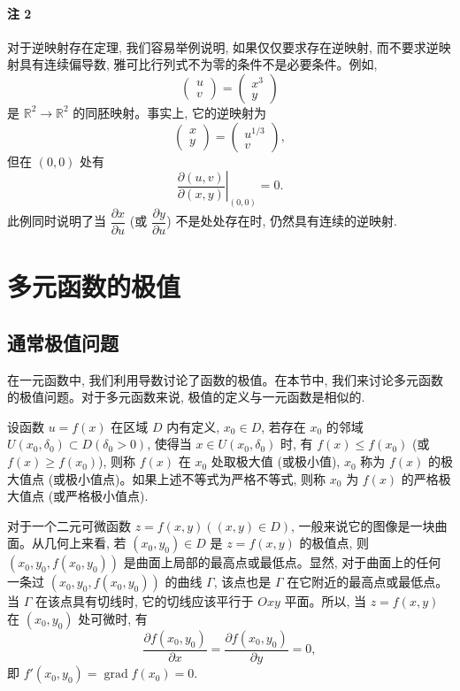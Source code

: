 \paragraph*{注 2}
对于逆映射存在定理, 我们容易举例说明, 如果仅仅要求存在逆映射, 而不要求逆映射具有连续偏导数, 雅可比行列式不为零的条件不是必要条件。例如,
\[
  \begin{pmatrix}
    u\\
    v
  \end{pmatrix}
  =
  \begin{pmatrix}
    x^3\\
    y
  \end{pmatrix}
\]
是 $\mathbb R^2\to\mathbb R^2$ 的同胚映射。事实上, 它的逆映射为
\[
  \begin{pmatrix}
    x\\
    y
  \end{pmatrix}
  =
  \begin{pmatrix}
    u^{1/3}\\
    v
  \end{pmatrix},
\]
但在 $(0,0)$ 处有
\[
  \left.
  \frac{\partial(u,v)}{\partial(x,y)}
  \right|_{(0,0)}
  =0.
\]
此例同时说明了当 $\dfrac{\partial x}{\partial u}$ (或 $\dfrac{\partial y}{\partial u}$) 不是处处存在时, 仍然具有连续的逆映射.

\section{多元函数的极值}
\label{sec:ma-14-5}

\subsection{通常极值问题}
\label{subsec:ma-14-5-1}

在一元函数中, 我们利用导数讨论了函数的极值。在本节中, 我们来讨论多元函数的极值问题。对于多元函数来说, 极值的定义与一元函数是相似的.

\begin{definition}\label{definition:ma-14-5-1}
设函数 $u=f(x)$ 在区域 $D$ 内有定义, $x_0\in D$, 若存在 $x_0$ 的邻域 $U(x_0,\delta_0)\subset D(\delta_0>0)$, 使得当 $x\in U(x_0,\delta_0)$ 时, 有 $f(x)\leqslant f(x_0)$ (或 $f(x)\geqslant f(x_0)$), 则称 $f(x)$ 在 $x_0$ 处取极大值 (或极小值), $x_0$ 称为 $f(x)$ 的极大值点 (或极小值点)。如果上述不等式为严格不等式, 则称 $x_0$ 为 $f(x)$ 的严格极大值点 (或严格极小值点).
\end{definition}

对于一个二元可微函数 $z=f(x,y)((x,y)\in D)$, 一般来说它的图像是一块曲面。从几何上来看, 若 $(x_0,y_0)\in D$ 是 $z=f(x,y)$ 的极值点, 则 $(x_0,y_0,f(x_0,y_0))$ 是曲面上局部的最高点或最低点。显然, 对于曲面上的任何一条过 $(x_0,y_0,f(x_0,y_0))$ 的曲线 $\Gamma$, 该点也是 $\Gamma$ 在它附近的最高点或最低点。当 $\Gamma$ 在该点具有切线时, 它的切线应该平行于 $Oxy$ 平面。所以, 当 $z=f(x,y)$ 在 $(x_0,y_0)$ 处可微时, 有
\[
  \frac{\partial f(x_0,y_0)}{\partial x}
  =
  \frac{\partial f(x_0,y_0)}{\partial y}
  =0,
\]
即 $f'(x_0,y_0)=\operatorname{grad} f(x_0)=0$.

